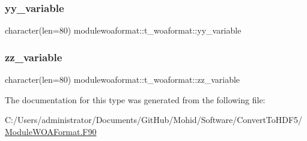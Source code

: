 \subsubsection{\texorpdfstring{yy\+\_\+variable}{yy\_variable}}
{\footnotesize\ttfamily character(len=80) modulewoaformat\+::t\+\_\+woaformat\+::yy\+\_\+variable\hspace{0.3cm}{\ttfamily [private]}}

\mbox{\label{structmodulewoaformat_1_1t__woaformat_a627b1b6af50668b896791a4d9f6f460b}} 
\subsubsection{\texorpdfstring{zz\+\_\+variable}{zz\_variable}}
{\footnotesize\ttfamily character(len=80) modulewoaformat\+::t\+\_\+woaformat\+::zz\+\_\+variable\hspace{0.3cm}{\ttfamily [private]}}



The documentation for this type was generated from the following file\+:\begin{DoxyCompactItemize}
\item 
C\+:/\+Users/administrator/\+Documents/\+Git\+Hub/\+Mohid/\+Software/\+Convert\+To\+H\+D\+F5/\mbox{\hyperlink{_module_w_o_a_format_8_f90}{Module\+W\+O\+A\+Format.\+F90}}\end{DoxyCompactItemize}
